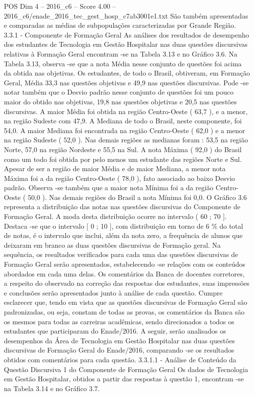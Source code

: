 \begin{textsample}{POS Dim 4 – 2016\_c6 – Score 4.00 – 2016\_c6/enade\_2016\_tec\_gest\_hosp\_c7ab3001e1.txt}
São também apresentadas e comparadas as médias de subpopulações caracterizadas por Grande Região. 3.3.1 - Componente de Formação Geral As análises dos resultados de desempenho dos estudantes de Tecnologia em Gestão Hospitalar nas duas questões discursivas relativas à Formação Geral encontram -se na Tabela 3.13 e no Gráfico 3.6.
Na Tabela 3.13, observa -se que a nota Média nesse conjunto de questões foi acima da obtida nas objetivas.
Os estudantes, de todo o Brasil, obtiveram, em Formação Geral, Média 33,3 nas questões objetivas e 49,9 nas questões discursivas.
Pode -se notar também que o Desvio padrão nesse conjunto de questões foi um pouco maior do obtido nas objetivas, 19,8 nas questões objetivas e 20,5 nas questões discursivas.
A maior Média foi obtida na região Centro-Oeste ( 63,7 ), e a menor, na região Sudeste com 47,9.
A Mediana de todo o Brasil, neste componente, foi 54,0.
A maior Mediana foi encontrada na região Centro-Oeste ( 62,0 ) e a menor na região Sudeste ( 52,0 ).
Nas demais regiões as medianas foram : 53,5 na região Norte, 57,0 na região Nordeste e 55,5 na Sul.
A nota Máxima ( 92,0 ) do Brasil como um todo foi obtida por pelo menos um estudante das regiões Norte e Sul.
Apesar de ser a região de maior Média e de maior Mediana, a menor nota Máxima foi a da região Centro-Oeste ( 78,0 ), fato associado ao baixo Desvio padrão.
Observa -se também que a maior nota Mínima foi a da região Centro-Oeste ( 50,0 ).
Nas demais regiões do Brasil a nota Mínima foi 0,0.
O Gráfico 3.6 representa a distribuição das notas nas questões discursivas do Componente de Formação Geral.
A moda desta distribuição ocorre no intervalo ( 60 ; 70 ].
Destaca -se que o intervalo [ 0 ; 10 ], com distribuição em torno de 6 \% do total de notas, é o intervalo que inclui, além da nota zero, a frequência de alunos que deixaram em branco as duas questões discursivas de Formação geral.
Na sequência, os resultados verificados para cada uma das questões discursivas de Formação Geral serão apresentados, estabelecendo -se relações com os conteúdos abordados em cada uma delas.
Os comentários da Banca de docentes corretores, a respeito do observado na correção das respostas dos estudantes, suas impressões e conclusões serão apresentados junto à análise de cada questão.
Cumpre esclarecer que, tendo em vista que as questões discursivas de Formação Geral são padronizadas, ou seja, constam de todas as provas, os comentários da Banca são os mesmos para todas as carreiras acadêmicas, sendo direcionados a todos os estudantes que participaram do Enade/2016.
A seguir, serão analisados os desempenhos da Área de Tecnologia em Gestão Hospitalar nas duas questões discursivas de Formação Geral do Enade/2016, comparando -se os resultados obtidos com comentários para cada questão. 3.3.1.1 - Análise de Conteúdo da Questão Discursiva 1 do Componente de Formação Geral Os dados de Tecnologia em Gestão Hospitalar, obtidos a partir das respostas à questão 1, encontram -se na Tabela 3.14 e no Gráfico 3.7.

\end{textsample}
